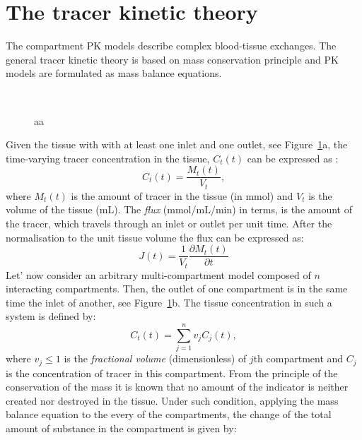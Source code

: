 \section{The tracer kinetic theory} 
The compartment PK models describe complex blood-tissue exchanges. The general tracer kinetic theory is based on mass conservation principle and PK models are formulated as mass balance equations. 
\begin{figure}[H]
\captionsetup[subfloat]{captionskip=0.5cm}
	\centering
	\\	
\vspace{0.5cm}
\caption[ddd]{aa}
\label{fig:model}
\end{figure}
\noindent Given the tissue with with at least one inlet and one outlet, see Figure~\ref{fig:model}a, the time-varying tracer concentration in the tissue, $C_t(t)$ can be expressed as \cite{thesis}:
\begin{equation}
C_t(t) = \frac{M_t(t)}{V_t},
\label{eq:pk1}
\end{equation}
where $M_t(t)$ is the amount of tracer in the tissue (in mmol) and $V_t$ is the volume of the tissue (mL). The \textit{flux} (mmol/mL/min) in terms, is the amount of the tracer, which travels through an inlet or outlet per unit time. After the normalisation to the unit tissue volume the flux can be expressed as:
\begin{equation}
J(t) = \frac{1}{V_t}\frac{\partial M_t(t)}{\partial t}
\label{eq:pk2}
\end{equation} 
Let' now consider an arbitrary multi-compartment model composed of $n$ interacting compartments. Then, the outlet of one compartment is in the same time the inlet of another, see Figure~\ref{fig:model}b. The tissue concentration in such a system is defined by:   
\begin{equation}
C_t(t) = \sum_{j=1}^{n}v_jC_j(t),
\label{eq:pk3}
\end{equation}
where $v_j\leq1$ is the \textit{fractional volume} (dimensionless) of $j$th compartment and $C_j$ is the concentration of tracer in this compartment. 
From the principle of the conservation of the mass it is known that no amount of the indicator is neither created nor destroyed in the tissue. Under such condition, applying the mass balance equation to the every of the compartments, the change of the total amount of substance in the compartment is given by:
